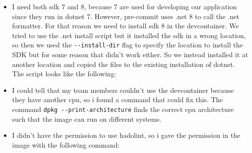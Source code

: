 \begin{itemize}
    \item I need both sdk 7 and 8, because 7 are used for developing our application since they run in dotnet 7. However, pre-commit uses .net 8 to call the .net formatter. For that reason we need to install sdk 8 in the devcontainer. We tried to use the .net install script but it installed the sdk in a wrong location, so then we used the \texttt{-\/-install-dir} flag to specify the location to install the SDK but for some reason that didn't work either. So we instead installed it at another location and copied the files to the existing installation of dotnet. The script looks like the following:

    \begin{Shaded}
    \begin{Highlighting}[]

      

     \PreprocessorTok{*}
    \end{Highlighting}
    \end{Shaded}

    \item I could tell that my team members couldn't use the devcontainer because they have another cpu, so i found a command that could fix this. The command \texttt{dpkg\ -\/-print-architecture} finds the correct cpu architecture such that the image can run on different systems.

    \item I didn't have the permission to use hadolint, so i gave the permission in the image with the following command:
    \begin{Shaded}
    \begin{Highlighting}[]
    \end{Highlighting}
    \end{Shaded}
    \end{itemize}

